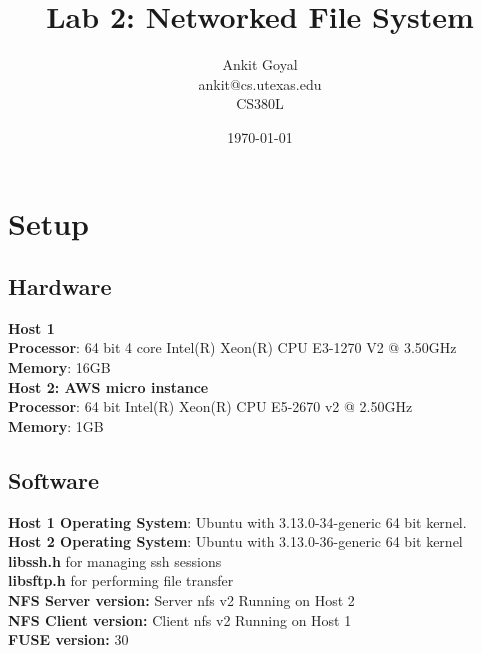 \documentclass[10pt] {article}
\author{Ankit Goyal \\ankit@cs.utexas.edu \\ CS380L}
\title{Lab 2: Networked File System}
\date{\today}
\begin{document}
\maketitle

\section{Setup}
\subsection{Hardware}

\textbf{Host 1} \\
\textbf{Processor}: 64 bit 4 core Intel(R) Xeon(R) CPU E3-1270 V2 @ 3.50GHz\\
\textbf{Memory}: 16GB \\

\textbf{Host 2: AWS micro instance} \\
\textbf{Processor}: 64 bit Intel(R) Xeon(R) CPU E5-2670 v2 @ 2.50GHz  \\
\textbf{Memory}: 1GB \\

\subsection{Software}
\textbf{Host 1 Operating System}: Ubuntu with 3.13.0-34-generic 64 bit kernel.\\
\textbf{Host 2 Operating System}: Ubuntu with 3.13.0-36-generic 64 bit kernel \\

\textbf{libssh.h} for managing ssh sessions \\
\textbf{libsftp.h} for performing file transfer \\

\textbf{NFS Server version:} Server nfs v2 Running on Host 2 \\
\textbf{NFS Client version:} Client nfs v2 Running on Host 1 \\

\textbf{FUSE version:} 30 \\


\end{document}
